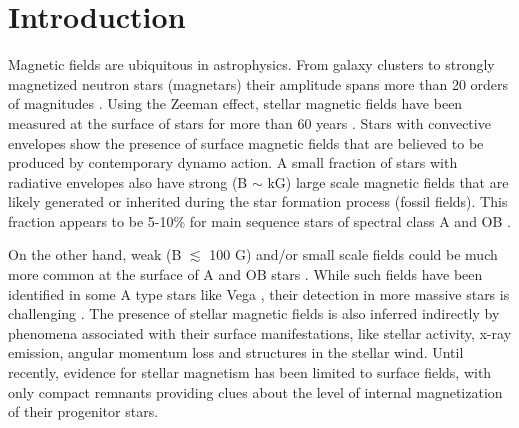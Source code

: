 \section{Introduction}
\label{intro}
Magnetic fields are ubiquitous in astrophysics. From  galaxy clusters to strongly magnetized neutron stars (magnetars) their amplitude spans more than 20 orders of magnitudes \citep{Brandenburg_2005}. Using the Zeeman effect, stellar magnetic fields have been measured at the surface of stars
for more than 60 years \citep{Babcock_1947,Landstreet_1992,Donati_2009}. Stars with convective envelopes show the presence of surface magnetic fields that are believed to be produced by contemporary dynamo action. A small fraction of stars with radiative envelopes also have strong (B $\sim$ kG) large scale magnetic fields that are likely generated or inherited during the star formation process (fossil fields). This fraction appears to be 5-10\% for main sequence stars of spectral class A \citep[e.g.,][]{Auriere2004} and OB \citep{2012ASPC..464..405W}.

On the other hand, weak (B $\lesssim$ 100 G) and/or small scale fields could be much more common at the surface of A and OB stars \citep{Cantiello_2011,Braithwaite_2012}. While such fields have been identified in some A type stars like Vega \citep{Lignieres2009}, their detection in more massive stars is challenging \citep{2013A&A...554A..93K}. The presence of stellar magnetic fields is also inferred indirectly by phenomena associated with their surface manifestations, like stellar activity, x-ray emission, angular momentum loss and structures in the stellar wind. Until recently, evidence for stellar magnetism has been limited to surface fields, with only compact remnants providing clues about the level of internal magnetization of their progenitor stars.

